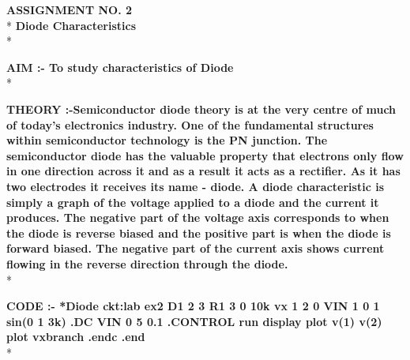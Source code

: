 \documentclass{article}
\begin{document}
\begin{center}
\Large{{\bf\color{rosewood}ASSIGNMENT NO. 2}}\\*
\vspace{2mm}
\large{{\bf\textcolor{rosewood}{ Diode Characteristics}}}\\*
\vspace{5mm}
\end{center}
\begin{flushleft}
\large{{\bf\textcolor{rosewood}{AIM :-} To study characteristics of Diode}}\vspace{5mm}\\*

\large{{\bf\textcolor{rosewood}{THEORY} :-Semiconductor diode theory is at the very centre of much of today's electronics industry.
One of the fundamental structures within semiconductor technology is the PN junction. The semiconductor diode has the valuable property that electrons only flow in one direction across it and as a result it acts as a rectifier. As it has two electrodes it receives its name - diode. 
A diode characteristic is simply a graph of the voltage applied to a diode and the current it produces. The negative part of the voltage axis corresponds to when the diode is reverse biased and the positive part is when the diode is forward biased. The negative part of the current axis shows current flowing in the reverse direction through the diode.  }}\vspace{5mm}\\*

\large{{\bf\textcolor{rosewood}{ CODE} :-
*Diode ckt:lab ex2\newline
D1 2 3\newline
R1 3 0 10k\newline
vx 1 2 0\newline
VIN 1 0 1 sin(0 1 3k)\newline
.DC VIN 0 5 0.1\newline
.CONTROL\newline
run\newline
display\newline
plot v(1) v(2)\newline
plot vxbranch\newline
.endc\newline
.end\newline}}\\*



\end{flushleft}
\end{document}
